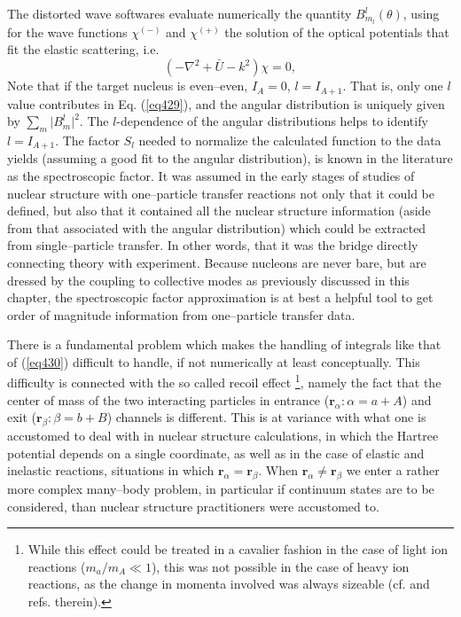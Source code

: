 \begin{subappendices}
The distorted wave softwares evaluate numerically  the quantity $B_{m_l}^l(\theta)$, using for the wave functions $\chi^{(-)}$ and $\chi^{(+)}$ the solution of the optical potentials that fit the elastic scattering, i.e.
\begin{equation}\label{eq435}
(-\nabla ^2+\bar U-k^2) \chi=0,
\end{equation}
Note that if the target nucleus is even--even, $I_A=0$,  $l=I_{A+1}$. That is, only one $l$ value contributes in Eq. (\ref{eq429}), and the angular distribution is uniquely given by $\sum_{m} \vert B_{m}^l\vert^2$. The $l$-dependence of the angular distributions helps to identify $l=I_{A+1}$. The factor $S_l$ needed to normalize the calculated function to the data yields (assuming a good fit to the angular distribution), is known in the literature as the spectroscopic factor. It was assumed in the early stages of studies of nuclear structure with one--particle transfer reactions not only that it could be defined, but also that it contained all the nuclear structure information (aside from that associated with the angular distribution) which could be extracted from single--particle transfer. In other words, that it was the bridge directly connecting theory with experiment. Because nucleons are never bare, but are dressed by the coupling to collective modes as previously discussed in this chapter, the spectroscopic factor approximation is at best a helpful tool to get order of magnitude information from one--particle transfer data.



There is a fundamental problem which makes the handling of integrals like that of (\ref{eq430}) difficult to handle, if not numerically at least conceptually. This difficulty is connected with the so called recoil effect \footnote{While this effect could be treated in a cavalier fashion in the case of light ion reactions ($m_a/m_A\ll 1$), this was not possible in the case of heavy ion reactions, as the change in momenta involved was always sizeable (cf. \citet{Broglia:04a} and refs. therein).}, namely the fact that the center of mass of the two interacting particles in entrance ($\mathbf r_{\alpha}: \alpha=a+A$) and exit  ($\mathbf r_{\beta}: \beta=b+B$) channels is different. This is at variance with what one is accustomed to deal with in nuclear structure calculations, in which the Hartree potential depends on a single coordinate, as well as in the case of elastic and inelastic reactions, situations in which $\mathbf r_{\alpha}=\mathbf r_{\beta}$. When $\mathbf r_{\alpha}\neq\mathbf r_{\beta}$ we enter a rather more complex many--body problem, in particular if continuum states are to be considered, than nuclear structure practitioners were accustomed to.
 

\end{subappendices}
